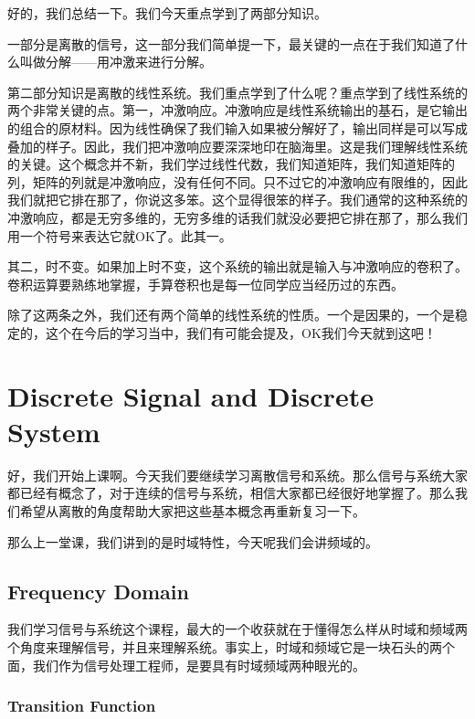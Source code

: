 \documentclass[a4paper,12pt]{article}
\begin{document}
好的，我们总结一下。我们今天重点学到了两部分知识。

一部分是离散的信号，这一部分我们简单提一下，最关键的一点在于我们知道了什么叫做分解——用冲激来进行分解。

第二部分知识是离散的线性系统。我们重点学到了什么呢？重点学到了线性系统的两个非常关键的点。第一，冲激响应。冲激响应是线性系统输出的基石，是它输出的组合的原材料。因为线性确保了我们输入如果被分解好了，输出同样是可以写成叠加的样子。因此，我们把冲激响应要深深地印在脑海里。这是我们理解线性系统的关键。这个概念并不新，我们学过线性代数，我们知道矩阵，我们知道矩阵的列，矩阵的列就是冲激响应，没有任何不同。只不过它的冲激响应有限维的，因此我们就把它排在那了，你说这多笨。这个显得很笨的样子。我们通常的这种系统的冲激响应，都是无穷多维的，无穷多维的话我们就没必要把它排在那了，那么我们用一个符号来表达它就OK了。此其一。

其二，时不变。如果加上时不变，这个系统的输出就是输入与冲激响应的卷积了。卷积运算要熟练地掌握，手算卷积也是每一位同学应当经历过的东西。

除了这两条之外，我们还有两个简单的线性系统的性质。一个是因果的，一个是稳定的，这个在今后的学习当中，我们有可能会提及，OK我们今天就到这吧！

\newpage
\section{Discrete Signal and Discrete System \uppercase\expandafter{}}\quad

好，我们开始上课啊。今天我们要继续学习离散信号和系统。那么信号与系统大家都已经有概念了，对于连续的信号与系统，相信大家都已经很好地掌握了。那么我们希望从离散的角度帮助大家把这些基本概念再重新复习一下。

那么上一堂课，我们讲到的是时域特性，今天呢我们会讲频域的。

\subsection{Frequency Domain}\quad

我们学习信号与系统这个课程，最大的一个收获就在于懂得怎么样从时域和频域两个角度来理解信号，并且来理解系统。事实上，时域和频域它是一块石头的两个面，我们作为信号处理工程师，是要具有时域频域两种眼光的。

\subsubsection{Transition Function}\quad
\end{document}
